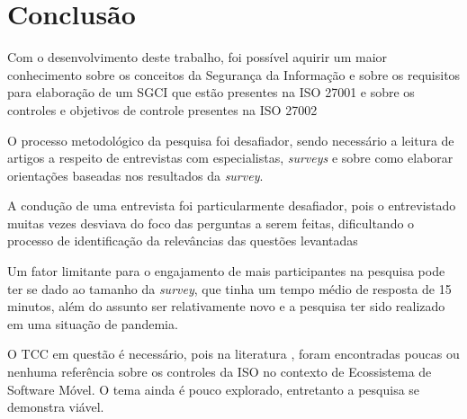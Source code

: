  \chapter{\label{chap:intro}Conclusão}
 


Com o desenvolvimento deste trabalho, foi possível aquirir um maior conhecimento sobre os conceitos da Segurança da Informação e sobre os requisitos para elaboração de um SGCI que estão presentes na ISO 27001 e sobre os controles e objetivos de controle presentes na ISO 27002
 
 
 O processo metodológico da pesquisa foi desafiador, sendo necessário a leitura de artigos a respeito de entrevistas com especialistas, \textit{surveys} e sobre como elaborar orientações baseadas nos resultados da \textit{survey}. 
 
 A condução de uma entrevista foi particularmente desafiador, pois o entrevistado muitas vezes desviava do foco das perguntas a serem feitas, dificultando o processo de identificação da relevâncias das questões levantadas
 
 
 
 Um fator limitante para o engajamento de mais participantes na pesquisa pode ter se dado ao tamanho da \textit{survey}, que tinha um tempo médio de resposta de 15 minutos, além do assunto ser relativamente novo e a pesquisa ter sido realizado em uma situação de pandemia.
 
 
 
 O TCC em questão é necessário, pois na literatura  \cite{caio2019}, foram encontradas poucas ou nenhuma referência sobre os controles da ISO no contexto de Ecossistema de Software Móvel. O tema ainda é pouco explorado, entretanto a pesquisa se demonstra viável.
 
 
 

 
